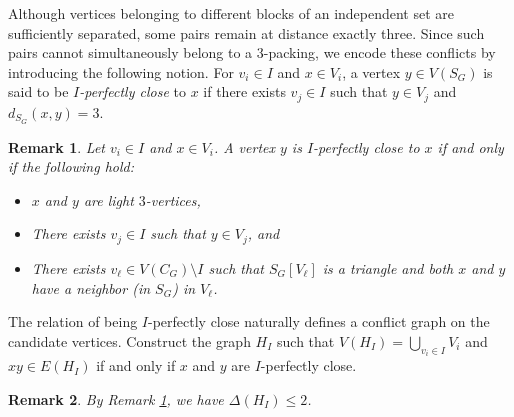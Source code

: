 \documentclass[12pt, oneside]{scrartcl}
\newtheorem{remark}{Remark}%
\begin{document}
Although vertices belonging to different blocks of an independent set are sufficiently separated, some pairs remain at distance exactly three. Since such pairs cannot simultaneously belong to a 3-packing, we encode these conflicts by introducing the following notion. For $v_i\in I$ and $x\in V_i$, a vertex $y\in V(S_G)$ is said to be \textit{$I$-perfectly close} to $x$ if there exists $v_j\in I$ such that $y\in V_j$ and $d_{S_G}(x,y)=3$.

\begin{remark}\label{r3}
    Let $v_i\in I$ and $x\in V_i$. A vertex $y$ is $I$-perfectly close to $x$ if and only if the following hold:\begin{itemize}
        \item[(i)] $x$ and $y$ are light $3$-vertices,
        \item[(ii)] There exists $v_j\in I$ such that $y\in V_j$, and 
        \item[(iii)] There exists $v_{\ell}\in V(C_G)\setminus I$ such that $S_G[V_{\ell}]$ is a triangle and both $x$ and $y$ have a neighbor (in $S_G$) in $V_{\ell}$.
    \end{itemize}
\end{remark}

The relation of being $I$-perfectly close naturally defines a conflict graph on the candidate vertices. Construct the graph $H_I$ such that $V(H_I)=\bigcup_{v_i\in I} V_i$ and $xy\in E(H_I)$ if and only if $x$ and $y$ are $I$-perfectly close.

\begin{remark}\label{r4}
    By Remark \ref{r3}, we have $\Delta(H_I)\leq 2$.
\end{remark}
\end{document}
